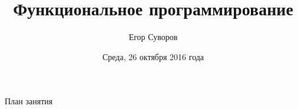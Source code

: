 \documentclass[utf8,xcolor=table]{beamer}
\title{Функциональное программирование}
\author{Егор Суворов}
\institute[СПб АУ]{Курс <<Парадигмы и языки программирования>>, подгруппа 3}
\date[26.10.2016]{Среда, 26 октября 2016 года}
\begin{document}
\begin{frame}
\titlepage
\end{frame}

\begin{frame}{План занятия}
	\tableofcontents
\end{frame}












\end{document}
